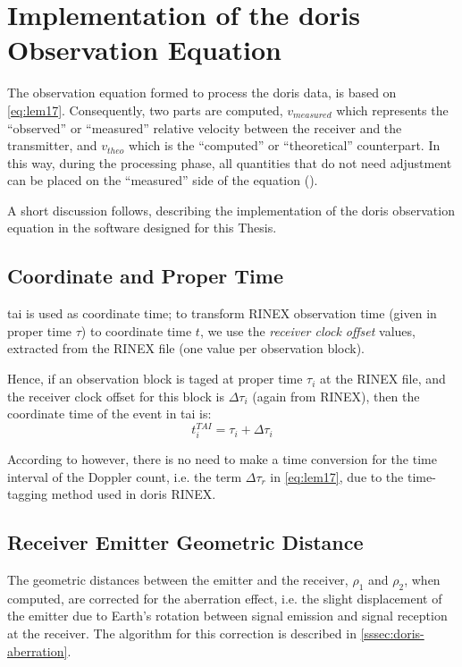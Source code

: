 \section{Implementation of the \gls{doris} Observation Equation}\label{sec:doris-observation-equation-implementation}
The observation equation formed to process the \gls{doris} data, is based on 
\autoref{eq:lem17}. Consequently, two parts are computed, $v_{measured}$ which 
represents the ``observed'' or ``measured'' relative velocity between the receiver 
and the transmitter, and $v_{theo}$ which is the ``computed'' or ``theoretical'' 
counterpart. In this way, during the processing phase, all quantities that do not 
need adjustment can be placed on the ``measured'' side of the equation (\cite{Lemoine2016}).

A short discussion follows, describing the implementation of the \gls{doris} 
observation equation in the software designed for this Thesis.

\subsection{Coordinate and Proper Time}\label{ssec:coordinate-proper-time}
\gls{tai} is used as coordinate time; to transform RINEX observation time (given in 
proper time $\tau$) to coordinate time $t$, we use the \emph{receiver clock 
offset} values, extracted from the RINEX file (one value per observation block).

Hence, if an observation block is taged at proper time $\tau _i$ at the RINEX 
file, and the receiver clock offset for this block is $\Delta \tau _i$ (again from 
RINEX), then the coordinate time of the event in \gls{tai} is:
\begin{equation}
  t^{TAI}_i = \tau _i + \Delta \tau _i
\end{equation}

According to \cite{Lemoine2016} however, there is no need to make a time conversion 
for the time interval of the Doppler count, i.e. the term $\Delta \tau _r$ in 
\autoref{eq:lem17}, due to the time-tagging method used in \gls{doris} RINEX.

\subsection{Receiver Emitter Geometric Distance}
The geometric distances between the emitter and the receiver, $\rho _1$ and $\rho _2$, 
when computed, are corrected for the aberration effect, i.e. the slight displacement of 
the emitter due to Earth's rotation between signal emission and signal reception at
the receiver. The algorithm for this correction is described in \autoref{sssec:doris-aberration}.

